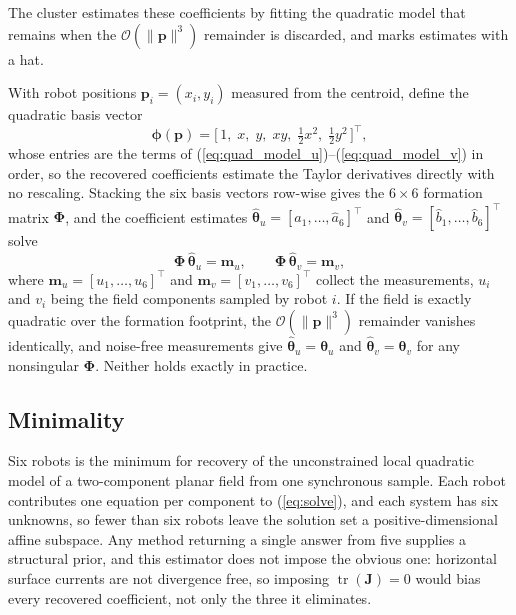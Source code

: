 \documentclass[lettersize,journal]{IEEEtran}
\begin{document}
The cluster estimates these coefficients by fitting the quadratic model
that remains when the $\mathcal{O}(\|\mathbf{p}\|^3)$ remainder is
discarded, and marks estimates with a hat.

With robot positions $\mathbf{p}_i = (x_i, y_i)$ measured from the
centroid, define the quadratic basis vector
\begin{equation}
    \boldsymbol{\phi}(\mathbf{p}) =
    \bigl[\,1, \; x, \; y, \; xy, \;
    \tfrac{1}{2}x^2, \; \tfrac{1}{2}y^2\,\bigr]^\top,
\end{equation}
whose entries are the terms of
(\ref{eq:quad_model_u})--(\ref{eq:quad_model_v}) in order, so
the recovered coefficients estimate the Taylor derivatives directly with
no rescaling. Stacking the six basis vectors row-wise gives
the $6 \times 6$ formation matrix $\boldsymbol{\Phi}$, and the coefficient
estimates $\hat{\boldsymbol{\theta}}_u = [\hat{a}_1, \ldots,
\hat{a}_6]^\top$ and $\hat{\boldsymbol{\theta}}_v = [\hat{b}_1, \ldots,
\hat{b}_6]^\top$ solve
\begin{equation}
    \boldsymbol{\Phi}\,\hat{\boldsymbol{\theta}}_u = \mathbf{m}_u, \qquad
    \boldsymbol{\Phi}\,\hat{\boldsymbol{\theta}}_v = \mathbf{m}_v,
    \label{eq:solve}
\end{equation}
where $\mathbf{m}_u = [u_1, \ldots, u_6]^\top$ and
$\mathbf{m}_v = [v_1, \ldots, v_6]^\top$ collect the measurements, $u_i$
and $v_i$ being the field components sampled by robot $i$.  If the field is exactly quadratic
over the formation footprint, the $\mathcal{O}(\|\mathbf{p}\|^3)$
remainder vanishes identically, and noise-free measurements give
$\hat{\boldsymbol{\theta}}_u = \boldsymbol{\theta}_u$ and
$\hat{\boldsymbol{\theta}}_v = \boldsymbol{\theta}_v$ for any nonsingular
$\boldsymbol{\Phi}$. Neither holds exactly in practice.

\subsection{Minimality}
\label{sec:minimality}

Six robots is the minimum for recovery of the unconstrained local
quadratic model of a two-component planar field from one synchronous
sample. Each robot contributes one equation per component to
(\ref{eq:solve}), and each system has six unknowns, so fewer than six
robots leave the solution set a positive-dimensional affine subspace.
Any method returning a single answer from five supplies a structural
prior, and this estimator does not impose the obvious one: horizontal surface
currents are not divergence free, so imposing
$\operatorname{tr}(\mathbf{J}) = 0$ would bias every recovered
coefficient, not only the three it eliminates.
\end{document}
